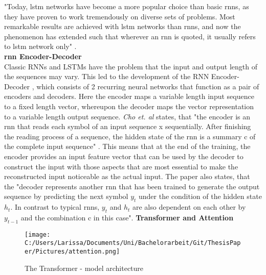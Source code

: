 \documentclass[a4paper, 11pt,titlepage,oneside,openany]{book}
\begin{document}
\noindent "Today, \gls{lstm} networks have become a more popular choice than basic \gls{rnn}s, as they have proven to work tremendously on diverse sets of problems. Most remarkable results are achieved with \gls{lstm} networks than \gls{rnn}s, and now the phenomenon has extended such that wherever an \gls{rnn} is quoted, it usually refers to \gls{lstm} network only" \cite{rnn}.\\

\noindent \textbf{\gls{rnn} Encoder-Decoder} \\
\noindent Classic RNNs and LSTMs have the problem that the input and output length of the sequences may vary. This led to the development of the RNN Encoder-Decoder \cite{encodedecode}, which consists of 2 recurring neural networks that function as a pair of encoders and decoders. Here the encoder maps a variable length input sequence to a fixed length vector, whereupon the decoder maps the vector representation to a variable length output sequence. \textit{Cho et. al} states, that "the encoder is an \gls{rnn} that reads each symbol of an input sequence x sequentially. After finishing the reading process of a sequence, the hidden state of the \gls{rnn} is a summary c of the complete input sequence" \cite{encodedecode}. This means that at the end of the training, the encoder provides an input feature vector that can be used by the decoder to construct the input with those aspects that are most essential to make the reconstructed input noticeable as the actual input. The paper also states, that the "decoder represents another \gls{rnn} that has been trained to generate the output sequence by predicting the next symbol $y_t$ under the condition of the hidden state $h_t$. In contrast to typical \gls{rnn}s, $y_t$ and $h_t$ are also dependent on each other by $y_{t-1}$ and the combination c in this case". 
\newpage
\noindent \textbf{Transformer and Attention} \\
\begin{figure}[h]
	\centering
	\texttt{[image: C:/Users/Larissa/Documents/Uni/Bachelorarbeit/Git/ThesisPaper/Pictures/attention.png]}
	\caption{The Transformer - model architecture \cite{attention}}
\end{figure}\\
\end{document}

